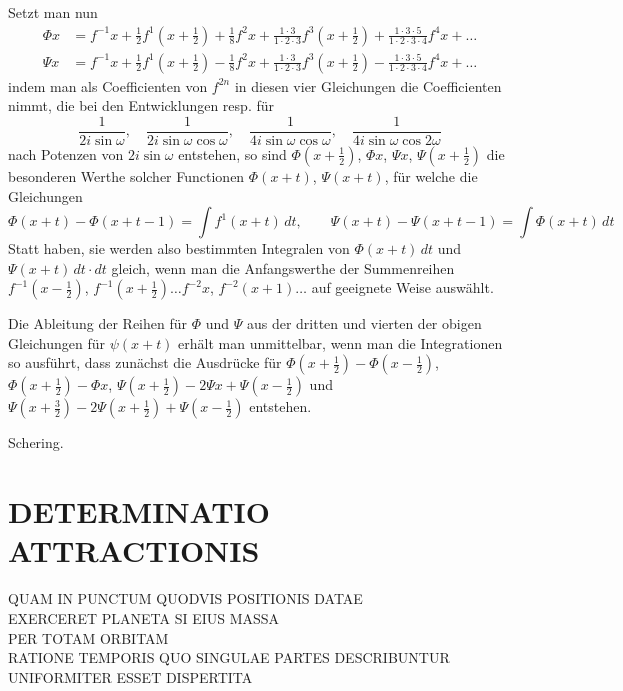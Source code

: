 \documentclass[12pt,a4paper]{article}
\theoremstyle{plain}
\begin{document}
Setzt man nun
\begin{align*}
\Phi x &= f^{-1}x + \frac{1}{2}f^1(x+\frac{1}{2}) + \frac{1}{8}f^2x + \frac{1\cdot 3}{1\cdot 2\cdot 3}f^3(x+\frac{1}{2}) + \frac{1\cdot 3\cdot 5}{1\cdot 2\cdot 3\cdot 4}f^4x + \ldots\\
\Psi x &= f^{-1}x + \frac{1}{2}f^1(x+\frac{1}{2}) - \frac{1}{8}f^2x + \frac{1\cdot 3}{1\cdot 2\cdot 3}f^3(x+\frac{1}{2}) - \frac{1\cdot 3\cdot 5}{1\cdot 2\cdot 3\cdot 4}f^4x + \ldots
\end{align*}
indem man als Coefficienten von $f^{2n}$ in diesen vier Gleichungen die Coefficienten
nimmt, die bei den Entwicklungen resp. für
\[
\frac{1}{2i\sin\omega},\quad \frac{1}{2i\sin\omega\cos\omega},\quad
\frac{1}{4i\sin\omega\cos\omega},\quad \frac{1}{4i\sin\omega\cos 2\omega}
\]
nach Potenzen von $2i\sin\omega$ entstehen, so sind $\Phi(x+\frac{1}{2})$, $\Phi x$, $\Psi x$,
$\Psi(x+\frac{1}{2})$ die besonderen Werthe solcher Functionen $\Phi(x+t)$, $\Psi(x+t)$, für welche die Gleichungen
\[
\Phi(x+t) - \Phi(x+t-1) = \int f^1(x+t)\,dt,\qquad
\Psi(x+t) - \Psi(x+t-1) = \int \Phi(x+t)\,dt
\]
Statt haben, sie werden also bestimmten Integralen von $\Phi(x+t)\,dt$ und
$\Psi(x+t)\,dt\cdot dt$ gleich, wenn man die Anfangswerthe der Summenreihen
$f^{-1}(x-\frac{1}{2})$, $f^{-1}(x+\frac{1}{2})\ldots f^{-2}x$, $f^{-2}(x+1)\ldots$ auf geeignete Weise auswählt.

Die Ableitung der Reihen für $\Phi$ und $\Psi$ aus der dritten und vierten der obigen Gleichungen für $\psi(x+t)$ erhält man unmittelbar, wenn man die Integrationen
so ausführt, dass zunächst die Ausdrücke für $\Phi(x+\frac{1}{2}) - \Phi(x-\frac{1}{2})$,
$\Phi(x+\frac{1}{2}) - \Phi x$, $\Psi(x+\frac{1}{2}) - 2\Psi x + \Psi(x-\frac{1}{2})$ und
$\Psi(x+\frac{3}{2}) - 2\Psi(x+\frac{1}{2}) + \Psi(x-\frac{1}{2})$ entstehen.

\begin{flushright} Schering.
\end{flushright}


\newpage
{}
\section*{DETERMINATIO ATTRACTIONIS}

\begin{center} QUAM IN PUNCTUM QUODVIS POSITIONIS DATAE\\
EXERCERET PLANETA SI EIUS MASSA\\
PER TOTAM ORBITAM\\
RATIONE TEMPORIS QUO SINGULAE PARTES DESCRIBUNTUR\\
UNIFORMITER ESSET DISPERTITA
\end{center}
\end{document}
